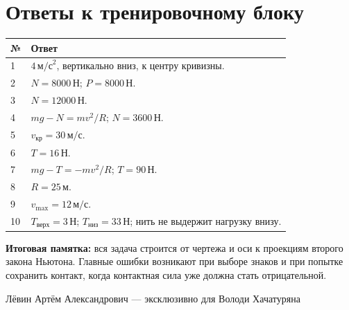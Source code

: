 \documentclass[a4paper,11pt]{article}
\begin{document}
\section*{Ответы к тренировочному блоку}
\vspace{.8cm}
\renewcommand{\arraystretch}{1.65}
\begin{tabularx}{\linewidth}{@{}p{1.8cm}X@{}}
\toprule
\textbf{№} & \textbf{Ответ} \\
\midrule
1 & $4\,\text{м/с}^2$, вертикально вниз, к центру кривизны. \\
2 & $N=8000\,\text{Н}$; $P=8000\,\text{Н}$. \\
3 & $N=12000\,\text{Н}$. \\
4 & $mg-N=mv^2/R$; $N=3600\,\text{Н}$. \\
5 & $v_{\text{кр}}=30\,\text{м/с}$. \\
6 & $T=16\,\text{Н}$. \\
7 & $mg-T=-mv^2/R$; $T=90\,\text{Н}$. \\
8 & $R=25\,\text{м}$. \\
9 & $v_{\max}=12\,\text{м/с}$. \\
10 & $T_{\text{верх}}=3\,\text{Н}$; $T_{\text{низ}}=33\,\text{Н}$; нить не выдержит нагрузку внизу. \\
\bottomrule
\end{tabularx}
\vfill
\textcolor{darkaccent}{\textbf{Итоговая памятка:}} вся задача строится от чертежа и оси к проекциям второго закона Ньютона. Главные ошибки возникают при выборе знаков и при попытке сохранить контакт, когда контактная сила уже должна стать отрицательной.
\vspace{.7cm}
\begin{center}
{\footnotesize\color{softgray}Лёвин Артём Александрович --- эксклюзивно для Володи Хачатуряна}
\end{center}
\end{document}
